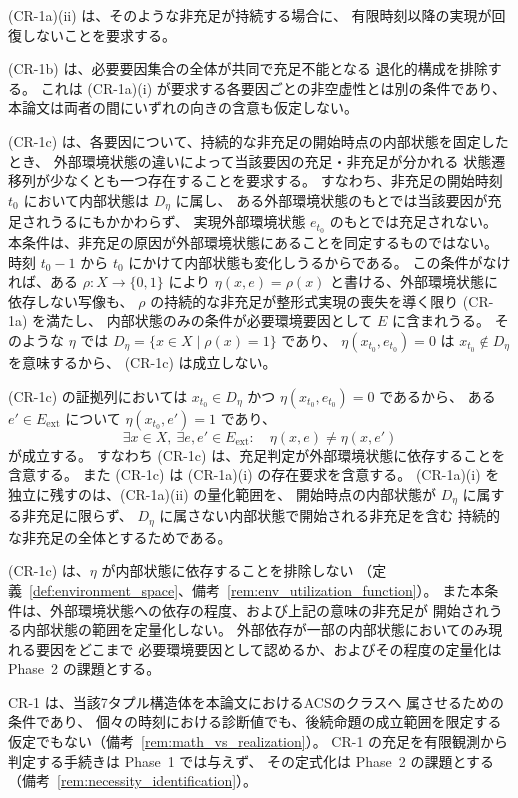 (CR-1a)(ii) は、そのような非充足が持続する場合に、
有限時刻以降の実現が回復しないことを要求する。

(CR-1b) は、必要要因集合の全体が共同で充足不能となる
退化的構成を排除する。
これは (CR-1a)(i) が要求する各要因ごとの非空虚性とは別の条件であり、
本論文は両者の間にいずれの向きの含意も仮定しない。

(CR-1c) は、各要因について、持続的な非充足の開始時点の内部状態を固定したとき、
外部環境状態の違いによって当該要因の充足・非充足が分かれる
状態遷移列が少なくとも一つ存在することを要求する。
すなわち、非充足の開始時刻 $t_0$ において内部状態は $D_\eta$ に属し、
ある外部環境状態のもとでは当該要因が充足されうるにもかかわらず、
実現外部環境状態 $e_{t_0}$ のもとでは充足されない。
本条件は、非充足の原因が外部環境状態にあることを同定するものではない。
時刻 $t_0-1$ から $t_0$ にかけて内部状態も変化しうるからである。
この条件がなければ、ある $\rho:X\to\{0,1\}$ により
$\eta(x,e)=\rho(x)$ と書ける、外部環境状態に依存しない写像も、
$\rho$ の持続的な非充足が整形式実現の喪失を導く限り (CR-1a) を満たし、
内部状態のみの条件が必要環境要因として $E$ に含まれうる。
そのような $\eta$ では $D_\eta=\{x\in X\mid\rho(x)=1\}$ であり、
$\eta(x_{t_0},e_{t_0})=0$ は $x_{t_0}\notin D_\eta$ を意味するから、
(CR-1c) は成立しない。

(CR-1c) の証拠列においては
$x_{t_0}\in D_\eta$ かつ $\eta(x_{t_0},e_{t_0})=0$ であるから、
ある $e'\in E_{\mathrm{ext}}$ について $\eta(x_{t_0},e')=1$ であり、
\[
  \exists x\in X,\ \exists e,e'\in E_{\mathrm{ext}}:\quad
  \eta(x,e)\neq\eta(x,e')
\]
が成立する。
すなわち (CR-1c) は、充足判定が外部環境状態に依存することを含意する。
また (CR-1c) は (CR-1a)(i) の存在要求を含意する。
(CR-1a)(i) を独立に残すのは、(CR-1a)(ii) の量化範囲を、
開始時点の内部状態が $D_\eta$ に属する非充足に限らず、
$D_\eta$ に属さない内部状態で開始される非充足を含む
持続的な非充足の全体とするためである。

(CR-1c) は、$\eta$ が内部状態に依存することを排除しない
（定義~\ref{def:environment_space}、備考~\ref{rem:env_utilization_function}）。
また本条件は、外部環境状態への依存の程度、および上記の意味の非充足が
開始されうる内部状態の範囲を定量化しない。
外部依存が一部の内部状態においてのみ現れる要因をどこまで
必要環境要因として認めるか、およびその程度の定量化は
Phase~2 の課題とする。

CR-1 は、当該7タプル構造体を本論文におけるACSのクラスへ
属させるための条件であり、
個々の時刻における診断値でも、後続命題の成立範囲を限定する
仮定でもない（備考~\ref{rem:math_vs_realization}）。
CR-1 の充足を有限観測から判定する手続きは Phase~1 では与えず、
その定式化は Phase~2 の課題とする
（備考~\ref{rem:necessity_identification}）。

